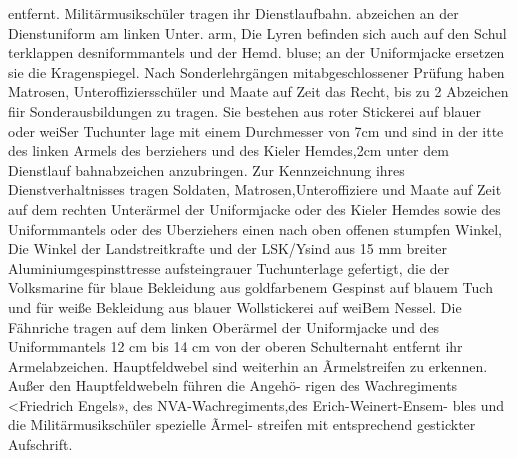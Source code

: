 entfernt.
Militärmusikschüler tragen ihr Dienstlaufbahn.
abzeichen an der Dienstuniform am linken Unter.
arm, Die Lyren befinden sich auch auf den Schul
terklappen desniformmantels und der Hemd.
bluse; an der
Uniformjacke ersetzen sie die
Kragenspiegel.
Nach Sonderlehrgängen mitabgeschlossener
Prüfung haben Matrosen, Unteroffiziersschüler
und Maate auf Zeit das Recht, bis zu 2 Abzeichen
fiir Sonderausbildungen zu tragen. Sie bestehen aus
roter Stickerei auf blauer oder weiSer Tuchunter
lage mit einem Durchmesser von 7cm und sind in
der itte des linken Armels des berziehers und
des Kieler Hemdes,2cm unter dem Dienstlauf
bahnabzeichen anzubringen.
Zur Kennzeichnung ihres Dienstverhaltnisses
tragen Soldaten, Matrosen,Unteroffiziere und
Maate auf Zeit auf dem rechten Unterärmel der
Uniformjacke oder des Kieler Hemdes sowie des
Uniformmantels oder des Uberziehers einen nach
oben offenen stumpfen Winkel, Die Winkel der
Landstreitkrafte und der LSK/Ysind aus 15 mm breiter Aluminiumgespinsttresse aufsteingrauer
Tuchunterlage gefertigt, die der Volksmarine für
blaue Bekleidung aus goldfarbenem Gespinst auf
blauem Tuch und für weiße Bekleidung aus blauer
Wollstickerei auf weiBem Nessel.
Die Fähnriche tragen auf dem linken Oberärmel
der Uniformjacke und des Uniformmantels 12 cm
bis 14 cm von der oberen Schulternaht entfernt ihr
Armelabzeichen. Hauptfeldwebel sind weiterhin an
Ãrmelstreifen zu erkennen.
Außer den Hauptfeldwebeln führen die Angehö-
rigen des Wachregiments <Friedrich Engels», des
NVA-Wachregiments,des Erich-Weinert-Ensem-
bles und die Militärmusikschüler spezielle Ãrmel-
streifen mit entsprechend gestickter Aufschrift.